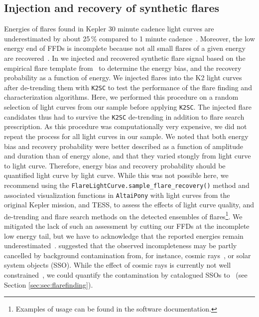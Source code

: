 \documentclass{aa}
\begin{document}
\subsection{Injection and recovery of synthetic flares}
\label{sec:sec:injrec}
Energies of flares found in Kepler 30 minute cadence light curves are underestimated by about 25\,\% compared to 1 minute cadence~\citep{yang_flaresampling_2018}. Moreover, the low energy end of FFDs is incomplete because not all small flares of a given energy are recovered~\citep{davenport_kepler_2016}. In  we injected and recovered synthetic flare signal based on the empirical flare template from~\citet{davenport_kepler_2014} to determine the energy bias, and the recovery probability as a function of energy. We injected flares into the K2 light curves after de-trending them with \texttt{K2SC} to test the performance of the flare finding and characterization algorithms. Here, we performed this procedure on a random selection of light curves from our sample before applying \texttt{K2SC}. The injected flare candidates thus had to survive the \texttt{K2SC} de-trending in addition to flare search prescription. As this procedure was computationally very expensive, we did not repeat the process for all light curves in our sample. We noted that both energy bias and recovery probability were better described as a function of amplitude and duration than of energy alone, and that they varied stongly from light curve to light curve. Therefore, energy bias and recovery probability should be quantified light curve by light curve. While this was not possible here, we recommend using the \texttt{FlareLightCurve.sample\_flare\_recovery()} method and associated visualization functions in \texttt{AltaiPony} with light curves from the original Kepler mission, and TESS, to assess the effects of light curve quality, and de-trending and flare search methods on the detected ensembles of flares\footnote{Examples of usage can be found in the software documentation.}. We mitigated the lack of such an assessment by cutting our FFDs at the incomplete low energy tail, but we have to acknowledge that the reported energies remain underestimated~\citep{yang_flaresampling_2018}. \citet{aschwanden_powerlaws_2015} suggested that the observed incompleteness may be partly cancelled by background contamination from, for instance, cosmic rays~, or solar system objects (SSO). While the effect of cosmic rays is currently not well constrained~, we could quantify the contamination by catalogued SSOs to ~(see Section \ref{sec:sec:flarefinding}).
\end{document}
